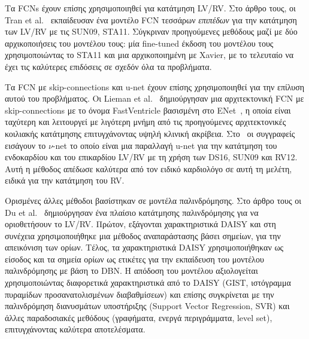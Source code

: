 Τα FCNs έχουν επίσης χρησιμοποιηθεί για κατάτμηση LV/RV\@.
Στο άρθρο τους, οι Tran et al.~\cite{tran2016fully} εκπαίδευσαν ένα μοντέλο FCN τεσσάρων \textit{επιπέδων} για την κατάτμηση των LV/RV με τις SUN09, STA11.
Σύγκριναν προηγούμενες μεθόδους μαζί με δύο αρχικοποιήσεις του μοντέλου τους: μία fine-tuned έκδοση του μοντέλου τους χρησιμοποιώντας το STA11 και μια αρχικοποιημένη με Xavier, με το τελευταίο να έχει τις καλύτερες επιδόσεις σε σχεδόν όλα τα προβλήματα.

Τα FCN με skip-connections και u-net έχουν επίσης χρησιμοποιηθεί για την επίλυση αυτού του προβλήματος.
Οι Lieman et al.~\cite{lieman2017fastventricle} δημιούργησαν μια αρχιτεκτονική FCN με skip-connections με το όνομα FastVentricle βασισμένη στο ENet~\cite{paszke2016enet}, η οποία είναι ταχύτερη και λειτουργεί με λιγότερη μνήμη από τις προηγούμενες αρχιτεκτονικές κοιλιακής κατάτμησης επιτυγχάνοντας υψηλή κλινική ακρίβεια.
Στο~\cite{winther2017nu} οι συγγραφείς εισάγουν το $\nu$-net το οποίο είναι μια παραλλαγή u-net για την κατάτμηση του ενδοκαρδίου και του επικαρδίου LV/RV με τη χρήση των DS16, SUN09 και RV12.
Αυτή η μέθοδος απέδωσε καλύτερα από τον ειδικό καρδιολόγο σε αυτή τη μελέτη, ειδικά για την κατάτμηση του RV\@.

Ορισμένες άλλες μέθοδοι βασίστηκαν σε μοντέλα παλινδρόμησης.
Στο άρθρο τους οι Du et al.~\cite{du2018deep} δημιούργησαν ένα πλαίσιο κατάτμησης παλινδρόμησης για να οριοθετήσουν το LV/RV\@.
Πρώτον, εξάγονται χαρακτηριστικά DAISY και στη συνέχεια χρησιμοποιήθηκε μια μέθοδος αναπαράστασης βάσει σημείων, για την απεικόνιση των ορίων.
Τέλος, τα χαρακτηριστικά DAISY χρησιμοποιήθηκαν ως είσοδος και τα σημεία ορίων ως ετικέτες για την εκπαίδευση του μοντέλου παλινδρόμησης με βάση το DBN\@.
Η απόδοση του μοντέλου αξιολογείται χρησιμοποιώντας διαφορετικά χαρακτηριστικά από το DAISY (GIST, ιστόγραμμα πυραμίδων προσανατολισμένων διαβαθμίσεων) και επίσης συγκρίνεται με την παλινδρόμηση διανυσμάτων υποστήριξης (Support Vector Regression, SVR) και άλλες παραδοσιακές μεθόδους (γραφήματα, ενεργά περιγράμματα, level set), επιτυγχάνοντας καλύτερα αποτελέσματα.

